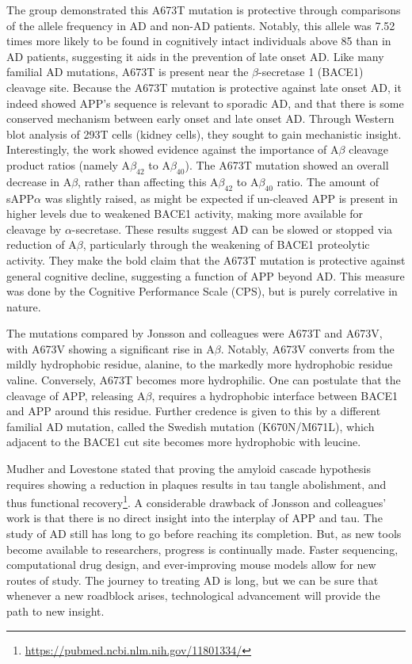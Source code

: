 The group demonstrated this A673T mutation is protective through comparisons of the allele frequency in AD and non-AD patients. Notably, this allele was 7.52 times more likely to be found in cognitively intact individuals above 85 than in AD patients, suggesting it aids in the prevention of late onset AD. Like many familial AD mutations, A673T is present near the $\beta$-secretase 1 (BACE1) cleavage site. Because the A673T mutation is protective against late onset AD, it indeed showed APP's sequence is relevant to sporadic AD, and that there is some conserved mechanism between early onset and late onset AD. Through Western blot analysis of 293T cells (kidney cells), they sought to gain mechanistic insight. Interestingly, the work showed evidence against the importance of A$\beta$ cleavage product ratios (namely A$\beta_{42}$ to A$\beta_{40}$). The A673T mutation showed an overall decrease in A$\beta$, rather than affecting this A$\beta_{42}$ to A$\beta_{40}$ ratio. The amount of sAPP$\alpha$ was slightly raised, as might be expected if un-cleaved APP is present in higher levels due to weakened BACE1 activity, making more available for cleavage by $\alpha$-secretase. These results suggest AD  can be slowed or stopped via reduction of A$\beta$, particularly through the weakening of BACE1 proteolytic activity. They make the bold claim that the A673T mutation is protective against general cognitive decline, suggesting a function of APP beyond AD. This measure was done by the Cognitive Performance Scale (CPS), but is purely correlative in nature.\newline

The mutations compared by Jonsson  and colleagues were A673T and A673V, with A673V showing a significant rise in A$\beta$. Notably, A673V converts from the mildly hydrophobic residue, alanine, to the markedly more hydrophobic residue valine. Conversely, A673T becomes more hydrophilic. One can postulate that the cleavage of APP, releasing A$\beta$, requires a hydrophobic interface between BACE1 and APP around this residue. Further credence is given to this by a different familial AD mutation, called the Swedish mutation (K670N/M671L), which adjacent to the BACE1 cut site becomes more hydrophobic with leucine.\newline

Mudher and Lovestone stated that proving the amyloid cascade hypothesis requires showing a reduction in plaques results in tau tangle abolishment, and thus functional recovery\footnote{\url{https://pubmed.ncbi.nlm.nih.gov/11801334/}}. A considerable drawback of Jonsson and colleagues' work is that there is no direct insight into the interplay of APP and tau. The study of AD still has long to go before reaching its completion. But, as new tools become available to researchers, progress is continually made. Faster sequencing, computational drug design, and ever-improving mouse models allow for new routes of study. The journey to treating AD is long, but we can be sure that whenever a new roadblock arises, technological advancement will provide the path to new insight. 

